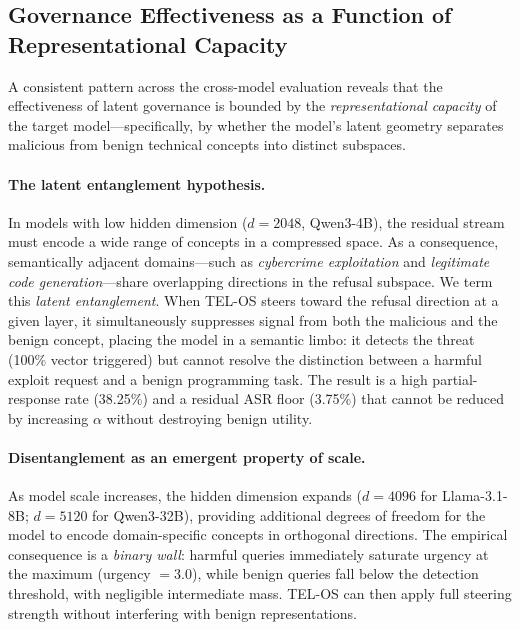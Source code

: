 \documentclass{article}
\begin{document}
\subsection{Governance Effectiveness as a Function of Representational Capacity}
\label{subsec:representational_capacity}

A consistent pattern across the cross-model evaluation reveals that the
effectiveness of latent governance is bounded by the \textit{representational
capacity} of the target model---specifically, by whether the model's latent
geometry separates malicious from benign technical concepts into distinct
subspaces.

\paragraph{The latent entanglement hypothesis.}
In models with low hidden dimension ($d = 2048$, Qwen3-4B), the residual stream
must encode a wide range of concepts in a compressed space. As a consequence,
semantically adjacent domains---such as \textit{cybercrime exploitation} and
\textit{legitimate code generation}---share overlapping directions in the
refusal subspace. We term this \textit{latent entanglement}. When TEL-OS steers
toward the refusal direction at a given layer, it simultaneously suppresses
signal from both the malicious and the benign concept, placing the model in a
semantic limbo: it detects the threat (100\% vector triggered) but cannot
resolve the distinction between a harmful exploit request and a benign
programming task. The result is a high partial-response rate (38.25\%) and a
residual ASR floor (3.75\%) that cannot be reduced by increasing $\alpha$
without destroying benign utility.

\paragraph{Disentanglement as an emergent property of scale.}
As model scale increases, the hidden dimension expands ($d = 4096$ for
Llama-3.1-8B; $d = 5120$ for Qwen3-32B), providing additional degrees of
freedom for the model to encode domain-specific concepts in orthogonal
directions. The empirical consequence is a \textit{binary wall}: harmful
queries immediately saturate urgency at the maximum (urgency $= 3.0$), while
benign queries fall below the detection threshold, with negligible intermediate
mass. TEL-OS can then apply full steering strength without interfering with
benign representations.
\end{document}
